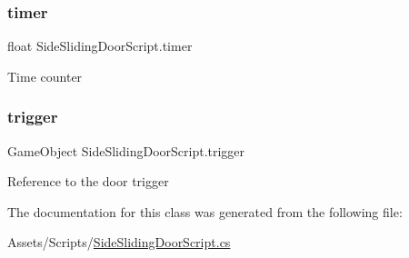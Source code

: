 \subsubsection{\texorpdfstring{timer}{timer}}
{\footnotesize\ttfamily float Side\+Sliding\+Door\+Script.\+timer\hspace{0.3cm}{\ttfamily [private]}}

Time counter \mbox{\label{class_side_sliding_door_script_ab8c5e23c0073f4f9a906dd6a6aab87cb}} 
\subsubsection{\texorpdfstring{trigger}{trigger}}
{\footnotesize\ttfamily Game\+Object Side\+Sliding\+Door\+Script.\+trigger}

Reference to the door trigger 

The documentation for this class was generated from the following file\+:\begin{DoxyCompactItemize}
\item 
Assets/\+Scripts/\mbox{\hyperlink{_side_sliding_door_script_8cs}{Side\+Sliding\+Door\+Script.\+cs}}\end{DoxyCompactItemize}
